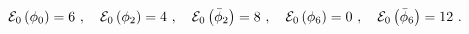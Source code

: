 \begin{equation}\label{eng1}
{\cal E}_0\left( \phi_0 \right) = 6 ~,~~~
{\cal E}_0\left(\phi_2 \right) = 4 ~,~~~
{\cal E}_0\left( \bar\phi_2\right) = 8 ~,~~~
{\cal E}_0\left( \phi_6 \right) = 0 ~,~~~
{\cal E}_0\left( \bar\phi_6 \right) = 12 ~.
\end{equation}

